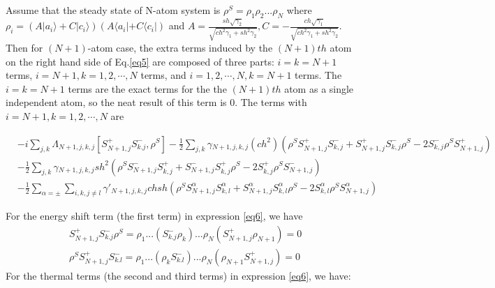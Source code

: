 \documentclass[aps,showpacs,twocolumn,twoside,groupedaddress]{revtex4}
\begin{document}
Assume that the steady state of N-atom system is $\rho^{S}=\rho_{1}\rho_{2}...\rho_{N}$ where $\rho_{i}=(A|a_{i}\rangle+C|c_{i}\rangle)(A\langle a_{i}|+C\langle c_{i}|)$ and $A=\frac{sh\sqrt{\gamma_{2}}}{\sqrt{ch^{2}\gamma_{1}+sh^{2}\gamma_{2}}}, C=-\frac{ch\sqrt{\gamma_{1}}}{\sqrt{ch^{2}\gamma_{1}+sh^{2}\gamma_{2}}}$. Then for $(N+1)$-atom case, the extra terms induced by the $(N+1)th$ atom on the right hand side of Eq.\eqref{eq5} are composed of three parts: $i=k=N+1$ terms, $i=N+1, k=1,2,\cdots,N$ terms, and $i=1,2,\cdots,N, k=N+1$ terms. The $i=k=N+1$ terms are the exact terms for the the $(N+1)th$ atom as a single independent atom, so the neat result of this term is 0. The terms with $i=N+1, k=1,2,\cdots, N$ are 
\begin{widetext}
\begin{equation}
\label{eq6}
\begin{split}
&-i\underset{j,k}{\sum}\Lambda_{N+1,j,k,j}[S_{N+1,j}^{+}S_{k.j}^{-},\rho^{S}] 
-\frac{1}{2}\underset{j,k}{\sum}\gamma{}_{N+1,j,k,j}(ch^{2})(\rho^{S}S_{N+1,j}^{+}S_{k,j}^{-}+S_{N+1,j}^{+}S_{k,j}^{-}\rho^{S}-2S_{k,j}^{-}\rho^{S}S_{N+1,j}^{+})\\
&-\frac{1}{2}\underset{j,k}{\sum}\gamma{}_{N+1,j,k,j}sh^{2}(\rho^{S}S_{N+1,j}^{-}S_{k,j}^{+}+S_{N+1,j}^{-}S_{k,j}^{+}\rho^{S}-2S_{k,j}^{+}\rho^{S}S_{N+1,j}^{-}) \\
&-\frac{1}{2}\sum_{\alpha=\pm}\underset{i,k,j\ne l}{\sum}\gamma'_{N+1,j,k,j}chsh(\rho^{S}S_{N+1,j}^{\alpha}S_{k,l}^{\alpha}+S_{N+1,j}^{\alpha}S_{k,l}^{\alpha}\rho^{S}-2S_{k,l}^{\alpha}\rho^{S}S_{N+1,j}^{\alpha})
\end{split}
\end{equation}
\end{widetext}
For the energy shift term (the first term) in expression \eqref{eq6}, we have 
\begin{equation}
\label{eq7}
\begin{split}
&S_{N+1,j}^{+}S_{k.j}^{-}\rho^{S}=\rho_{1}...(S_{k.j}^{-}\rho_{k})...\rho_{N}(S_{N+1,j}^{+}\rho_{N+1})=0\\
&\rho^{S}S_{N+1,j}^{+}S_{k.l}^{-}=\rho_{1}...(\rho_{k}S_{k.l}^{-})...\rho_{N}(\rho_{N+1}S_{N+1,j}^{+})=0
\end{split}
\end{equation}
For the thermal terms (the second and third terms) in expression \eqref{eq6}, we have:
\end{document}
